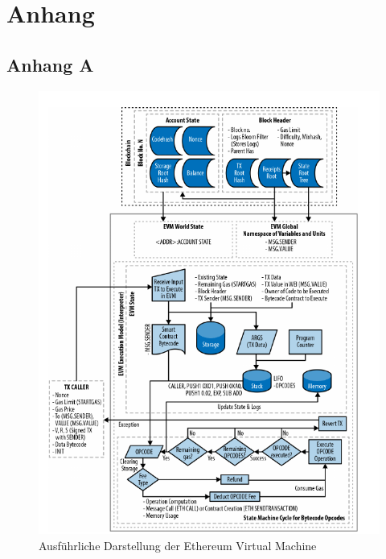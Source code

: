 
\appendix
\chapter{Anhang}

\section{Anhang A}

\begin{figure}[htpb]
	\centering
	\includegraphics[width=\textwidth]{images/evm_full.png}
	\caption{Ausführliche Darstellung der Ethereum Virtual Machine}
	\label{6braun:fig:EVM_full}
\end{figure}